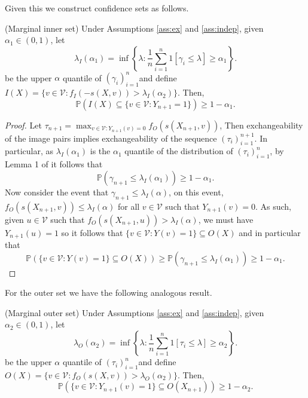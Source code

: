 Given this we construct confidence sets as follows.
\begin{theorem}\label{thm:inner}
	(Marginal inner set)
	Under Assumptions \ref{ass:ex} and \ref{ass:indep}, given $\alpha_1 \in (0,1)$, let 
	\begin{equation*}
		\lambda_I(\alpha_1) = \inf\left\lbrace \lambda: \frac{1}{n} \sum_{i = 1}^n 1\left[ \gamma_i\leq \lambda \right] \geq \alpha_1 \right\rbrace.
	\end{equation*}
	be the upper $\alpha$ quantile of $(\gamma_i)_{i = 1}^n$and define $I(X) = \lbrace v \in \mathcal{V}: f_I(-s(X,v)) >\lambda_I(\alpha_2)  \rbrace $. Then,
	\begin{equation}\label{eq:probstat}
		\mathbb{P}\left( I(X) \subseteq\lbrace v\in \mathcal{V}: Y_{n+1} = 1 \rbrace \right) \geq 1 - \alpha_1.
	\end{equation}
\end{theorem}
\begin{proof}
	Let $\tau_{n+1}= \max_{v \in \mathcal{V}: Y_{n+1}(v) = 0} f_O(s(X_{n+1},v))$, Then exchangeability of the image pairs implies exchangeability of the sequence $(\tau_i)_{i = 1}^{n+1}$. In particular, as $\lambda_I(\alpha_1)$ is the $\alpha_1$ quantile of the distribution of $(\tau_i)_{i = 1}^{n}$, by Lemma 1 of \cite{} it follows that 
	\begin{equation*}
	\mathbb{P}\left(\gamma_{n+1} \leq \lambda_I(\alpha_1) \right) \geq 1 - \alpha_1. 
	\end{equation*}
	Now consider the event that $\gamma_{n+1}\leq \lambda_I(\alpha) $, on this event, $ f_O(s(X_{n+1},v)) \leq \lambda_I(\alpha) $
	for all $v \in \mathcal{V}$ such that $Y_{n+1}(v) = 0$. As such, given $u \in \mathcal{V}$ such that $ f_O(s(X_{n+1},u)) > \lambda_I(\alpha) $, we must have $Y_{n+1}(u) = 1$ so it follows that $	\lbrace v\in \mathcal{V}: Y(v) = 1 \rbrace \subseteq O(X) $ and in particular that 
	\begin{equation*}
	\mathbb{P}\left( \lbrace v\in \mathcal{V}: Y(v) = 1 \rbrace \subseteq O(X)  \right) \geq \mathbb{P}\left(\gamma_{n+1} \leq \lambda_I(\alpha_1) \right) \geq 1 - \alpha_1. 
\end{equation*}
\end{proof}
\noindent For the outer set we have the following analogous result.
\begin{theorem}\label{thm:outer}
	(Marginal outer set)
	Under Assumptions \ref{ass:ex} and \ref{ass:indep}, given $\alpha_2 \in (0,1)$, let 
	\begin{equation*}
		\lambda_O({\alpha_2})= \inf\left\lbrace \lambda: \frac{1}{n} \sum_{i = 1}^n 1\left[ \tau_i\leq \lambda \right] \geq \alpha_2 \right\rbrace.
	\end{equation*}
	be the upper $\alpha$ quantile of $(\tau_i)_{i = 1}^n$and define $O(X) = \lbrace v \in \mathcal{V}: f_O(s(X,v)) >\lambda_O(\alpha_2)  \rbrace $. Then,
	\begin{equation}\label{eq:probstat}
		\mathbb{P}\left( \lbrace v\in \mathcal{V}: Y_{n+1}(v) = 1 \rbrace \subseteq O(X_{n+1}) \right) \geq 1 - \alpha_2.
	\end{equation}
\end{theorem}
